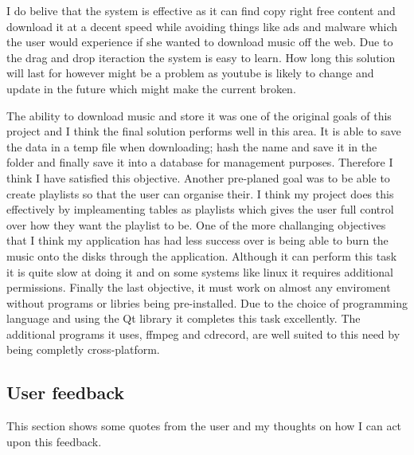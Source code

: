 \documentclass{article}
\begin{document}
I do belive that the system is effective as it can find copy right free content and download it at a decent
speed while avoiding things like ads and malware which the user would experience if she wanted to download
music off the web. Due to the drag and drop iteraction the system is easy to learn. How long this solution
will last for however might be a problem as youtube is likely to change and update in the future which
might make the current broken.

The ability to download music and store it was one of the original goals of this project and I think the
final solution performs well in this area. It is able to save the data in a temp file when downloading;
hash the name and save it in the folder and finally save it into a database for management purposes. Therefore
I think I have satisfied this objective. Another pre-planed goal was to be able to create playlists so that
the user can organise their. I think my project does this effectively by impleamenting tables as playlists
which gives the user full control over how they want the playlist to be. One of the more challanging
objectives that I think my application has had less success over is being able to burn the music
onto the disks through the application. Although it can perform this task it is quite slow at doing it
and on some systems like linux it requires additional permissions. Finally the last objective, it must
work on almost any enviroment without programs or libries being pre-installed. Due to the choice of programming
language and using the Qt library it completes this task excellently. The additional programs it uses, ffmpeg
and cdrecord, are well suited to this need by being completly cross-platform.


\subsection{User feedback}
This section shows some quotes from the user and my thoughts on how I can act upon this feedback.
\end{document}
